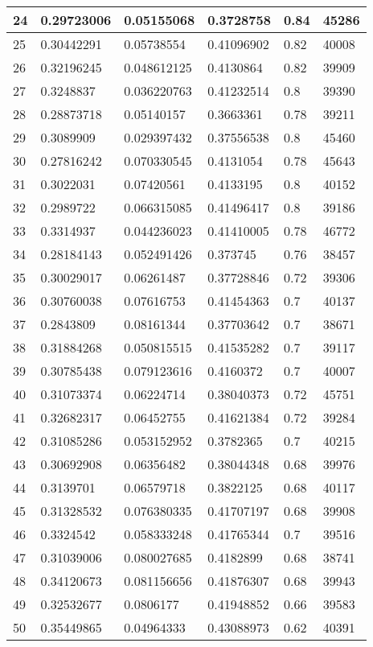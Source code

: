 \begin{longtable}{|l|l|l|l|l|l|}
24 & 0.29723006 & 0.05155068 & 0.3728758 & 0.84 & 45286 \\ \hline 
25 & 0.30442291 & 0.05738554 & 0.41096902 & 0.82 & 40008 \\ \hline 
26 & 0.32196245 & 0.048612125 & 0.4130864 & 0.82 & 39909 \\ \hline 
27 & 0.3248837 & 0.036220763 & 0.41232514 & 0.8 & 39390 \\ \hline 
28 & 0.28873718 & 0.05140157 & 0.3663361 & 0.78 & 39211 \\ \hline 
29 & 0.3089909 & 0.029397432 & 0.37556538 & 0.8 & 45460 \\ \hline 
30 & 0.27816242 & 0.070330545 & 0.4131054 & 0.78 & 45643 \\ \hline 
31 & 0.3022031 & 0.07420561 & 0.4133195 & 0.8 & 40152 \\ \hline 
32 & 0.2989722 & 0.066315085 & 0.41496417 & 0.8 & 39186 \\ \hline 
33 & 0.3314937 & 0.044236023 & 0.41410005 & 0.78 & 46772 \\ \hline 
34 & 0.28184143 & 0.052491426 & 0.373745 & 0.76 & 38457 \\ \hline 
35 & 0.30029017 & 0.06261487 & 0.37728846 & 0.72 & 39306 \\ \hline 
36 & 0.30760038 & 0.07616753 & 0.41454363 & 0.7 & 40137 \\ \hline 
37 & 0.2843809 & 0.08161344 & 0.37703642 & 0.7 & 38671 \\ \hline 
38 & 0.31884268 & 0.050815515 & 0.41535282 & 0.7 & 39117 \\ \hline 
39 & 0.30785438 & 0.079123616 & 0.4160372 & 0.7 & 40007 \\ \hline 
40 & 0.31073374 & 0.06224714 & 0.38040373 & 0.72 & 45751 \\ \hline 
41 & 0.32682317 & 0.06452755 & 0.41621384 & 0.72 & 39284 \\ \hline 
42 & 0.31085286 & 0.053152952 & 0.3782365 & 0.7 & 40215 \\ \hline 
43 & 0.30692908 & 0.06356482 & 0.38044348 & 0.68 & 39976 \\ \hline 
44 & 0.3139701 & 0.06579718 & 0.3822125 & 0.68 & 40117 \\ \hline 
45 & 0.31328532 & 0.076380335 & 0.41707197 & 0.68 & 39908 \\ \hline 
46 & 0.3324542 & 0.058333248 & 0.41765344 & 0.7 & 39516 \\ \hline 
47 & 0.31039006 & 0.080027685 & 0.4182899 & 0.68 & 38741 \\ \hline 
48 & 0.34120673 & 0.081156656 & 0.41876307 & 0.68 & 39943 \\ \hline 
49 & 0.32532677 & 0.0806177 & 0.41948852 & 0.66 & 39583 \\ \hline 
50 & 0.35449865 & 0.04964333 & 0.43088973 & 0.62 & 40391 \\ \hline 
\end{longtable}